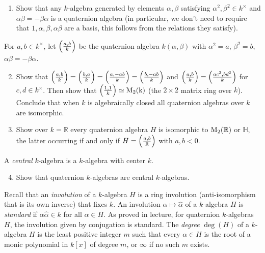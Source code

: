 \documentclass[11pt]{article}
\newcommand{\R}{\mathbb{R}}
\newcommand{\qalg}[3]{\Bigl(\frac{#1,#2}{#3}\Bigr)}
\theoremstyle{definition}
\begin{document}
\begin{enumerate}[{\bf (a)}]
\item Show that any $k$-algebra generated by elements $\alpha,\beta$ satisfying $\alpha^2,\beta^2\in k^\times$ and $\alpha\beta=-\beta\alpha$ is a quaternion algebra (in particular, we don't need to require that $1,\alpha,\beta,\alpha\beta$ are a basis, this follows from the relations they satisfy).
\end{enumerate}

\noindent
For $a,b\in k^\times$, let $\qalg{a}{b}{k}$ be the quaternion algebra $k(\alpha,\beta)$ with $\alpha^2=a$, $\beta^2=b$, $\alpha\beta=-\beta\alpha$.

\begin{enumerate}[{\bf (a)}]
\setcounter{enumi}{1}
\item Show that $\qalg{a}{b}{k}=\qalg{b}{a}{k}=\qalg{a}{-ab}{k}=\qalg{b}{-ab}{k}$ and $\qalg{a}{b}{k}=\qalg{ac^2}{bd^2}{k}$ for $c,d\in k^\times$.
Then show that $\qalg{1}{1}{k}\simeq \rm{M}_2(k)$ (the $2\times 2$ matrix ring over $k$).
Conclude that when $k$ is algebraically closed all quaternion algebras over $k$ are isomorphic.
\item Show over $k=\R$ every quaternion algebra $H$ is isomorphic to ${\rm M}_2(\R)$ or $\mathbb{H}$, the latter occurring if and only if $H=\qalg{a}{b}{\R}$ with $a,b<0$.
\end{enumerate}

\noindent
A \emph{central} $k$-algebra is a $k$-algebra with center $k$.

\begin{enumerate}[{\bf (a)}]
\setcounter{enumi}{3}
\item Show that quaternion $k$-algebras are central $k$-algebras.
\end{enumerate}

\noindent
Recall that an \textit{involution} of a $k$-algebra $H$ is a ring involution (anti-isomorphism that is its own inverse) that fixes $k$.
An involution $\alpha\mapsto \hat\alpha$ of a $k$-algebra $H$ is \emph{standard} if $\alpha\hat\alpha\in k$ for all $\alpha\in H$.  As proved in lecture, for quaternion $k$-algebras $H$, the involution given by conjugation is standard.
The \emph{degree} $\deg(H)$ of a $k$-algebra $H$ is the least positive integer $m$ such that every $\alpha\in H$ is the root of a monic polynomial in $k[x]$ of degree $m$, or $\infty$ if no such $m$ exists.
\end{document}
